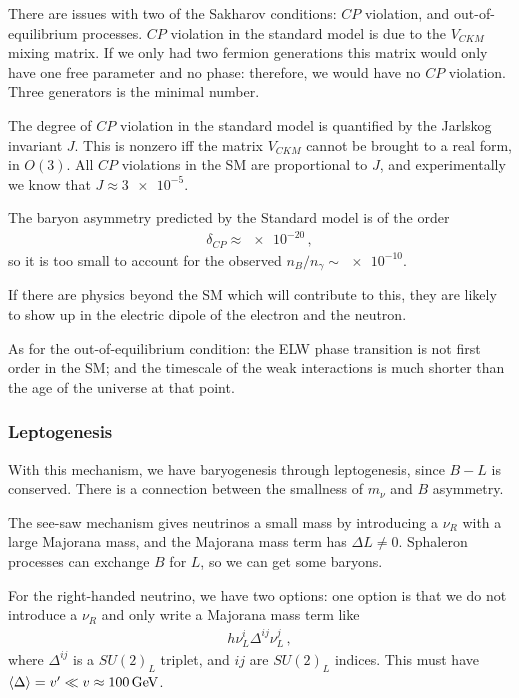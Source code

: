 \documentclass[main.tex]{subfiles}
\begin{document}
There are issues with two of the Sakharov conditions: \(CP\) violation, and out-of-equilibrium processes. 
\(CP\) violation in the standard model is due to the \(V_{CKM}\) mixing matrix. 
If we only had two fermion generations this matrix would only have one free parameter and no phase: therefore, we would have no \(CP\) violation. Three generators is the minimal number. 

The degree of \(CP\) violation in the standard model is quantified by the Jarlskog invariant \(J\). This is nonzero iff the matrix \(V_{CKM}\) cannot be brought to a real form, in \(O(3)\). 
All \(CP\) violations in the SM are proportional to \(J\), and experimentally we know that \(J \approx \num{3e-5}\). 

The baryon asymmetry predicted by the Standard model is of the order 
%
\begin{align}
\delta_{CP} \approx \num{e-20}
\,,
\end{align}
%
so it is too small to account for the observed \(n_B / n_\gamma \sim
\num{e-10}\). 

If there are physics beyond the SM which will contribute to this, they are likely to show up in the electric dipole of the electron and the neutron.

As for the out-of-equilibrium condition: the ELW phase transition is not first order in the SM; and the timescale of the weak interactions is much shorter than the age of the universe at that point. 

\subsubsection{Leptogenesis}

With this mechanism, we have baryogenesis through leptogenesis, since \(B - L\) is conserved. 
There is a connection between the smallness of \(m_\nu \) and \(B\) asymmetry. 

The see-saw mechanism gives neutrinos a small mass by introducing a \(\nu_{R}\) with a large Majorana mass, and the Majorana mass term has \(\Delta L \neq 0\). 
Sphaleron processes can exchange \(B\) for \(L\), so we can get some baryons. 

For the right-handed neutrino, we have two options: one option is that we do not introduce a \(\nu_{R} \) and only write a Majorana mass term like  
%
\begin{align}
h \nu_{L}^{i} \Delta^{ij} \nu_{L}^{j}
\,,
\end{align}
%
where \(\Delta^{ij}\) is a \(SU(2)_L\) triplet, and \(ij\) are \(SU(2)_L\) indices. 
This must have \(\expval{\Delta } = v' \ll v \approx \SI{100}{GeV}\). 
\end{document}
